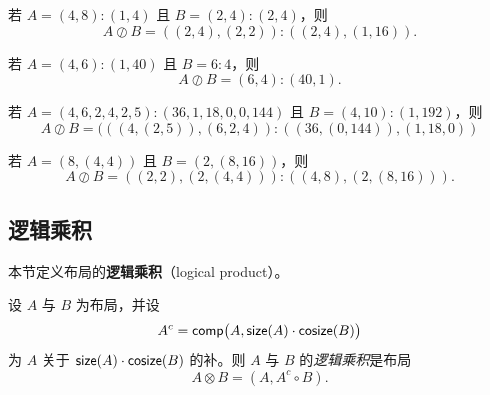 \begin{example}
    若 $A = (4,8):(1,4)$ 且 $B = (2,4):(2,4)$，则
    \[A \oslash B = ((2,4),(2,2)):((2,4),(1,16)).\]
\end{example}


\begin{example}
    若 $A = (4,6):(1,40)$ 且 $B = 6:4$，则
    \[
    A \oslash B = (6,4):(40,1).
    \]
\end{example}

\begin{example}
    若 $A = (4,6,2,4,2,5) : (36,1,18,0,0,144 )$ 且 $B = (4,10):(1,192)$，则
    \[
    A \oslash B = (((4,(2,5)),(6,2,4)):((36,(0,144)
    ),(1,18,0))
    \]
\end{example}

\begin{example}
    若 $A = (8,(4,4))$ 且 $B = (2,(8,16))$，则
    \[
    A \oslash B = ((2,2),(2,(4,4))):((4,8),(2,(8,16))).
    \]
\end{example}

\subsection{逻辑乘积}\label{logicalproductsection}

本节定义布局的{\bf 逻辑乘积}（logical product）。






\begin{definition} \label{definitionoflogicalproduct}
设 $A$ 与 $B$ 为布局，并设
\[
A^c = \mathsf{comp}\bigl(A,\mathsf{size}(A)\cdot \mathsf{cosize}(B) \bigr)
\]
为 $A$ 关于 $\mathsf{size}(A) \cdot \mathsf{cosize}(B)$ 的补。则 $A$ 与 $B$ 的{\it 逻辑乘积}是布局
\[
A \otimes B = (A , A^c \circ B).
\]
\end{definition}

